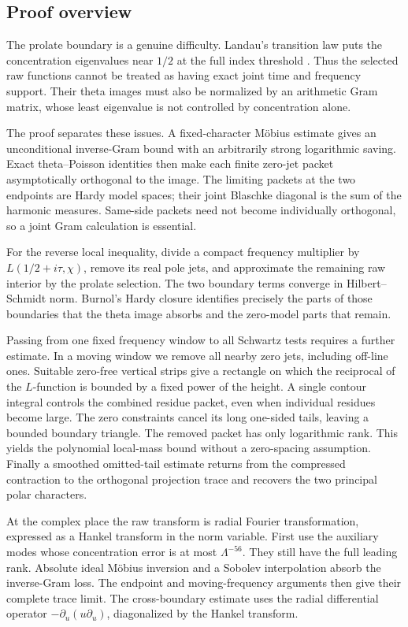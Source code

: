 \subsection{Proof overview}
The prolate boundary is a genuine difficulty. Landau's transition
law puts the concentration eigenvalues near $1/2$ at the full
index threshold \citep[pp.~209, 211]{landau1985}. Thus the selected
raw functions cannot be treated as having exact joint time and
frequency support. Their theta images must also be normalized by
an arithmetic Gram matrix, whose least eigenvalue is not controlled
by concentration alone.

The proof separates these issues. A fixed-character M\"obius
estimate gives an unconditional inverse-Gram bound with an
arbitrarily strong logarithmic saving. Exact theta--Poisson
identities then make each finite zero-jet packet asymptotically
orthogonal to the image. The limiting packets at the two endpoints
are Hardy model spaces; their joint Blaschke diagonal is the sum
of the harmonic measures. Same-side packets need not become
individually orthogonal, so a joint Gram calculation is essential.

For the reverse local inequality, divide a compact frequency
multiplier by $L(1/2+i\tau,\chi)$, remove its real pole jets, and approximate the
remaining raw interior by the prolate selection. The two boundary
terms converge in Hilbert--Schmidt norm. Burnol's Hardy closure
identifies precisely the parts of those boundaries that the theta
image absorbs and the zero-model parts that remain.

Passing from one fixed frequency window to all Schwartz tests
requires a further estimate. In a moving window we remove all
nearby zero jets, including off-line ones. Suitable zero-free
vertical strips give a rectangle on which the reciprocal of the $L$-function
is bounded by a fixed power of the height. A single contour
integral controls the combined residue packet, even when individual
residues become large. The zero constraints cancel its long
one-sided tails, leaving a bounded boundary triangle. The removed
packet has only logarithmic rank. This yields the polynomial
local-mass bound without a zero-spacing assumption. Finally a
smoothed omitted-tail estimate returns from the compressed
contraction to the orthogonal projection trace and recovers the
two principal polar characters.

At the complex place the raw transform is radial Fourier transformation,
expressed as a Hankel transform in the norm variable. First use the
auxiliary modes whose concentration error is at most $\Lambda^{-56}$.
They still have the full leading rank. Absolute ideal M\"obius inversion
and a Sobolev interpolation absorb the inverse-Gram loss. The endpoint
and moving-frequency arguments then give their complete trace limit.
The cross-boundary estimate uses the radial differential operator
$-\partial_u(u\partial_u)$, diagonalized by the Hankel transform.

